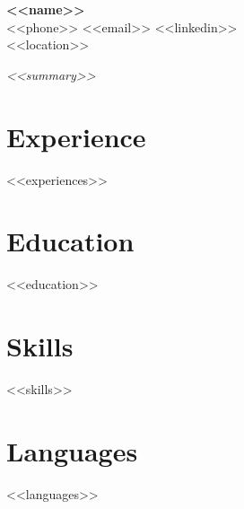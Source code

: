 \documentclass[11pt,a4paper]{article}
\begin{document}
{\Large\bfseries <<name>>}\\[2pt]
{\small <<phone>> \quad <<email>> \quad <<linkedin>>}\\
{\small <<location>>}

\vspace{6pt}

{\small\itshape <<summary>>}

\section{Experience}
<<experiences>>

\section{Education}
<<education>>

\section{Skills}
<<skills>>

\section{Languages}
<<languages>>
\end{document}
